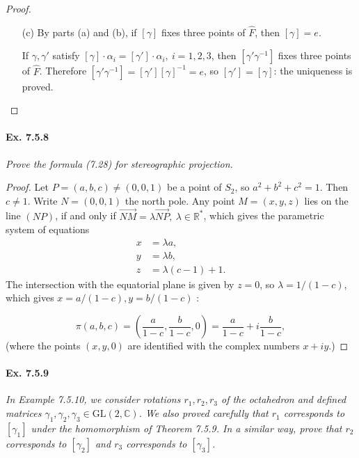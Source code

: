 \documentclass[11pt,a4paper]{article}
\newcommand{\R}{\mathbb{R}}
\newcommand{\C}{\mathbb{C}}
\begin{document}
\begin{proof}
\begin{enumerate}
\item[(c)]
By parts (a) and (b), if $[\gamma]$ fixes three points of $\hat{F}$, then $[\gamma] = e$.

If $\gamma, \gamma'$ satisfy $[\gamma]  \cdot \alpha_i  = [\gamma']\cdot \alpha_i, \ i=1,2,3$, then $[\gamma' \gamma^{-1}]$ fixes three points of $\hat{F}$. Therefore $[\gamma' \gamma^{-1}]=[\gamma'] [\gamma]^{-1} = e$, so $[\gamma'] = [\gamma]$: the uniqueness is proved.

\end{enumerate}
\end{proof}

\paragraph{Ex. 7.5.8}

{\it Prove the formula (7.28) for stereographic projection.
}

\begin{proof}
Let $P = (a,b,c) \neq (0,0,1)$ be a point of $S_2$, so $a^2+b^2+c^2=1$. Then $c\neq 1$. Write $N = (0,0,1)$ the north pole.
Any point $M = (x,y,z)$ lies on the line $(NP)$, if and only if $\overrightarrow{NM} = \lambda \overrightarrow{NP}, \ \lambda \in \R^*$, which gives the parametric system of equations
\begin{align*}
x &= \lambda a,\\
y &=\lambda b,\\
z&=\lambda(c-1)+1.
\end{align*}
The intersection with the equatorial plane is given by $z=0$, so $\lambda = 1/(1-c)$, which gives $x=a/(1-c), y=b/(1-c)$ :

$$\pi(a,b,c) = \left(\frac{a}{1-c}, \frac{b}{1-c},0\right) = \frac{a}{1-c} + i \frac{b}{1-c},$$
(where the points $(x,y,0)$ are identified with the complex numbers $x+iy$.)
\end{proof}

\paragraph{Ex. 7.5.9}

{\it In Example 7.5.10, we consider rotations $r_1,r_2,r_3$ of the octahedron and defined matrices $\gamma_1,\gamma_2,\gamma_3 \in \mathrm{GL}(2,\C)$. We also proved carefully that $r_1$ corresponds to $[\gamma_1]$ under the homomorphism of Theorem 7.5.9. In a similar way, prove that $r_2$ corresponds to $[\gamma_2]$ and $r_3$ corresponds to $[\gamma_3]$.
}
\end{document}
